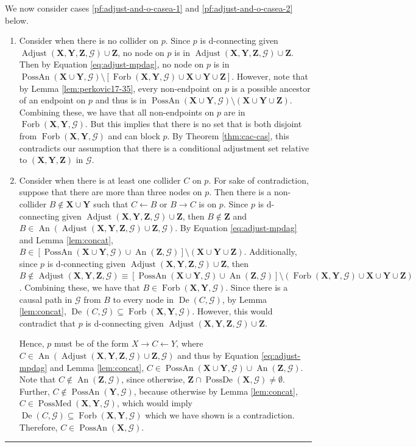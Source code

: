 \documentclass[twoside]{article}
\DeclareMathOperator{\An}{An}
\DeclareMathOperator{\De}{De}
\DeclareMathOperator{\PossDe}{PossDe}
\DeclareMathOperator{\PossAn}{PossAn}
\DeclareMathOperator{\Forb}{Forb}
\newcommand{\fb}[2][X,Y]{\Forb(\mb{#1},#2)}
\DeclareMathOperator{\Adjust}{Adjust}
\newcommand{\adjustb}[2][X,Y,Z]{\Adjust(\mb{#1},#2)}
\DeclareMathOperator{\PossMediators}{PossMed}
\newcommand{\possmediatb}[2][X,Y]{\PossMediators(\mb{#1},#2)}
\newcommand{\mb}[1]{\mathbf{#1}}
\newcommand{\g}[1][G]{\mathcal{#1}}
\newenvironment{proofof}[1][]{\begin{trivlist}
\item[\hskip \labelsep {\bfseries Proof of #1.}]}{\hfill\BlackBox\end{trivlist}}
\newcommand{\BlackBox}{\rule{1.5ex}{1.5ex}}
\begin{document}
\begin{proofof}[Theorem \ref{thm:adjust-and-o}]
        We now consider cases \ref{pf:adjust-and-o-casea-1} and \ref{pf:adjust-and-o-casea-2} below.
        \begin{enumerate}[label = (\arabic*)]
            \item\label{pf:adjust-and-o-casea-1} 
            Consider when there is no collider on $p$. Since $p$ is d-connecting given $\adjustb{\g} \cup \mb{Z}$, no node on $p$ is in $\adjustb{\g} \cup \mb{Z}$. Then by Equation \eqref{eq:adjust-mpdag}, no node on $p$ is in $\PossAn(\mb{X \cup Y},\g) \setminus [\fb{\g} \cup \mb{X} \cup \mb{Y} \cup \mb{Z}]$. However, note that by Lemma \ref{lem:perkovic17-35}, every non-endpoint on $p$ is a possible ancestor of an endpoint on $p$ and thus is in $\PossAn(\mb{X \cup Y}, \g) \setminus (\mb{X} \cup \mb{Y} \cup \mb{Z})$. Combining these, we have that all non-endpoints on $p$ are in $\fb{\g}$. But this implies that there is no set that is both disjoint from $\fb{\g}$ and can block $p$. By Theorem \ref{thm:cac-cas}, this contradicts our assumption that there is a conditional adjustment set relative to $(\mb{X,Y,Z})$ in $\g$.
            
            \item\label{pf:adjust-and-o-casea-2} 
            Consider when there is at least one collider $C$ on $p$. For sake of contradiction, suppose that there are more than three nodes on $p$. Then there is a non-collider $B \notin \mb{X} \cup \mb{Y}$ such that $C \gets B$ or $B \to C$ is on $p$. Since $p$ is d-connecting given $\adjustb{\g} \cup \mb{Z}$, then $B \notin \mb{Z}$ and $B \in \An(\adjustb{\g} \cup \mb{Z}, \g)$. By Equation \eqref{eq:adjust-mpdag} and Lemma \ref{lem:concat}, $B \in [\PossAn(\mb{X \cup Y},\g) \cup \An(\mb{Z}, \g)] \setminus (\mb{X} \cup \mb{Y} \cup \mb{Z})$. Additionally, since $p$ is d-connecting given $\adjustb{\g} \cup \mb{Z}$, then $B \notin \adjustb{\g} \equiv [\PossAn(\mb{X \cup Y},\g) \cup \An(\mb{Z}, \g)] \setminus (\fb{\g} \cup \mb{X} \cup \mb{Y} \cup \mb{Z})$. Combining these, we have that $B \in \fb{\g}$. Since there is a causal path in $\g$ from $B$ to every node in $\De(C,\g)$, by Lemma \ref{lem:concat}, $\De(C,\g) \subseteq \fb{\g}$. However, this would contradict that $p$ is d-connecting given $\adjustb{\g} \cup \mb{Z}$.

            Hence, $p$ must be of the form $X \to C \leftarrow Y$, where $C \in \An(\adjustb{\g} \cup \mb{Z},\g)$ and thus by Equation \eqref{eq:adjust-mpdag} and Lemma \ref{lem:concat}, $C \in \PossAn(\mb{X \cup Y},\g) \cup \An(\mb{Z}, \g)$. Note that $C \notin \An(\mb{Z}, \g)$, since otherwise, $\mb{Z} \cap \PossDe(\mb{X}, \g) \neq \emptyset$. Further, $C \notin \PossAn(\mb{Y}, \g)$, because otherwise by Lemma \ref{lem:concat}, $C \in \possmediatb{\g}$, which would imply $\De(C,\g) \subseteq \fb{\g}$ which we have shown is a contradiction. Therefore, $C \in \PossAn(\mb{X}, \g)$.


\end{enumerate}
\end{proofof}
\end{document}
